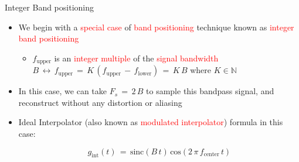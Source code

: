 \documentclass{beamer}
\begin{document}
\begin{frame}[t]{Integer Band positioning}

\begin{itemize}

\item We begin with a \textcolor{red}{special case} of \textcolor{red}{band positioning} technique known as \textcolor{red}{integer band positioning}

	\begin{itemize}
	\item $f_{\text{upper}}$ is an \textcolor{red}{integer multiple} of the \textcolor{red}{signal bandwidth} $B \, \leftrightarrow \, f_{\text{upper}} \, = \, K \, (f_{\text{upper}} \, - \, f_{\text{lower}}) \, = \, K \, B$ where $K \in \mathbb{N}$
	\end{itemize}


\item In this case, we can take $F_s \, = \, 2 \, B$ to sample this bandpass signal, and reconstruct without any distortion or aliasing

\item Ideal Interpolator (also known as \textcolor{red} {modulated interpolator}) formula in this case:

\begin{equation}
g_{\text{int}}(t) \, = \, \text{sinc}(B \, t) \, \text{cos}(2 \, \pi \, f_{\text{center}} \, t)
\end{equation}

\end{itemize}

\end{frame}
\end{document}
